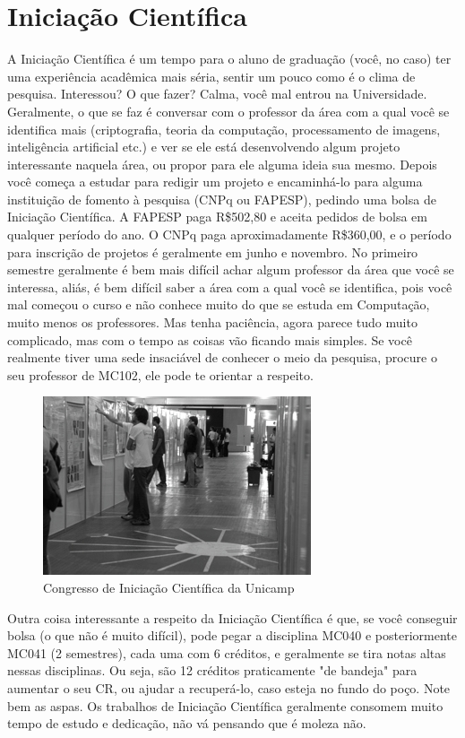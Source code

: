 
\section{Iniciação Científica}

A Iniciação Científica é um tempo para o aluno de graduação (você, no caso) ter
uma experiência acadêmica mais séria, sentir um pouco como é o clima de
pesquisa. Interessou? O que fazer? Calma, você mal entrou na Universidade.
Geralmente, o que se faz é conversar com o professor da área com a qual você se
identifica mais (criptografia, teoria da computação, processamento de imagens,
inteligência artificial etc.) e ver se ele está desenvolvendo algum projeto
interessante naquela área, ou propor para ele alguma ideia sua mesmo.
Depois você começa a estudar para redigir um projeto e encaminhá-lo para alguma
instituição de fomento à pesquisa (CNPq ou FAPESP), pedindo uma bolsa de
Iniciação Científica. A FAPESP paga R\$502,80 e aceita pedidos de bolsa em
qualquer período do ano. O CNPq paga aproximadamente R\$360,00, e o período para
inscrição de projetos é geralmente em junho e novembro. No primeiro semestre
geralmente é bem mais difícil achar algum professor da área que você se
interessa, aliás, é bem difícil saber a área com a qual você se identifica, pois
você mal começou o curso e não conhece muito do que se estuda em Computação,
muito menos os professores. Mas tenha paciência, agora parece tudo muito
complicado, mas com o tempo as coisas vão ficando mais simples. Se
você realmente tiver uma sede insaciável de conhecer o meio da pesquisa, procure
o seu professor de MC102, ele pode te orientar a respeito.
\begin{figure}[h!]
    \centering
    \includegraphics[scale=0.85, keepaspectratio=true]{img/imgs/15-iniciacao/-087.jpg}
    \caption{Congresso de Iniciação Científica da Unicamp}
\end{figure}
Outra coisa interessante a respeito da Iniciação Científica é que, se você
conseguir bolsa (o que não é muito difícil), pode pegar a disciplina MC040
e posteriormente MC041 (2 semestres), cada uma com 6 créditos, e geralmente se
tira notas altas nessas disciplinas. Ou seja, são 12 créditos praticamente "de
bandeja" para aumentar o seu CR, ou ajudar a recuperá-lo, caso esteja no fundo
do poço. Note bem as aspas. Os trabalhos de Iniciação Científica geralmente
consomem muito tempo de estudo e dedicação, não vá pensando que é moleza não.

